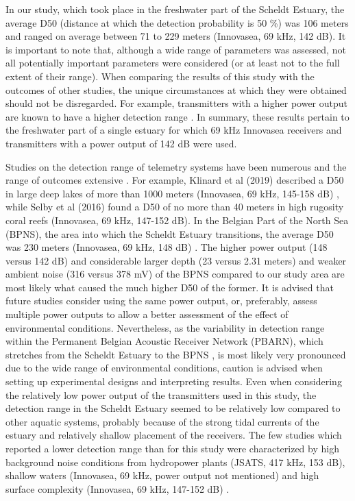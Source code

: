 \documentclass[doublespacing,linenumbers]{bmcart}
\begin{document}
In our study, which took place in the freshwater part of the Scheldt Estuary, the average D50 (distance at which the detection probability is 50 \%) was 106 meters and ranged on average between 71 to 229 meters (Innovasea, 69 kHz, 142 dB). It is important to note that, although a wide range of parameters was assessed, not all potentially important parameters were considered (or at least not to the full extent of their range). When comparing the results of this study with the outcomes of other studies, the unique circumstances at which they were obtained should not be disregarded. For example, transmitters with a higher power output are known to have a higher detection range \cite{Klinard2019TheLake}. In summary, these results pertain to the freshwater part of a single estuary for which 69 kHz Innovasea receivers and transmitters with a power output of 142 dB were used. 

Studies on the detection range of telemetry systems have been numerous and the range of outcomes extensive \cite{Ammann2020FactorsSystem,Babin2019DetectionReservoir,Brownscombe2019,Huveneers2016TheReceivers,Klinard2019TheLake,Loher2017AUSA,Mathies2014,Reubens2018,Selby2016CanHabitat}. For example, Klinard et al (2019) described a D50 in large deep lakes of more than 1000 meters (Innovasea, 69 kHz, 145-158 dB) \cite{Klinard2019TheLake}, while Selby et al (2016) found a D50 of no more than 40 meters in high rugosity coral reefs \cite{Selby2016CanHabitat} (Innovasea, 69 kHz, 147-152 dB). In the Belgian Part of the North Sea (BPNS), the area into which the Scheldt Estuary transitions, the average D50 was 230 meters (Innovasea, 69 kHz, 148 dB) \cite{Reubens2018}. The higher power output (148 versus 142 dB) and considerable larger depth (23 versus 2.31 meters) and weaker ambient noise (316 versus 378 mV) of the BPNS compared to our study area are most likely what caused the much higher D50 of the former. It is advised that future studies consider using the same power output, or, preferably, assess multiple power outputs to allow a better assessment of the effect of environmental conditions. Nevertheless, as the variability in detection range within the Permanent Belgian Acoustic Receiver Network (PBARN), which stretches from the Scheldt Estuary to the BPNS \cite{Reubens2018}, is most likely very pronounced due to the wide range of environmental conditions, caution is advised when setting up experimental designs and interpreting results. Even when considering the relatively low power output of the transmitters used in this study, the detection range in the Scheldt Estuary seemed to be relatively low compared to other aquatic systems, probably because of the strong tidal currents of the estuary and relatively shallow placement of the receivers. The few studies which reported a lower detection range than for this study were characterized by high background noise conditions from hydropower plants (JSATS, 417 kHz, 153 dB)\cite{Weiland2011}, shallow waters (Innovasea, 69 kHz, power output not mentioned) \cite{Brownscombe2019} and high surface complexity (Innovasea, 69 kHz, 147-152 dB) \cite{Selby2016CanHabitat}.
\end{document}
